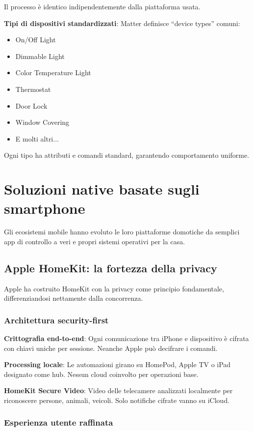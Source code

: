 Il processo è identico indipendentemente dalla piattaforma usata.

\textbf{Tipi di dispositivi standardizzati}: Matter definisce ``device types'' comuni:
\begin{itemize}
    \item On/Off Light
    \item Dimmable Light
    \item Color Temperature Light
    \item Thermostat
    \item Door Lock
    \item Window Covering
    \item E molti altri...
\end{itemize}

Ogni tipo ha attributi e comandi standard, garantendo comportamento uniforme.

\section{Soluzioni native basate sugli smartphone}

Gli ecosistemi mobile hanno evoluto le loro piattaforme domotiche da semplici app di controllo a veri e propri sistemi operativi per la casa.

\subsection{Apple HomeKit: la fortezza della privacy}

Apple ha costruito HomeKit con la privacy come principio fondamentale, differenziandosi nettamente dalla concorrenza.

\subsubsection{Architettura security-first}

\textbf{Crittografia end-to-end}: Ogni comunicazione tra iPhone e dispositivo è cifrata con chiavi uniche per sessione. Neanche Apple può decifrare i comandi.

\textbf{Processing locale}: Le automazioni girano su HomePod, Apple TV o iPad designato come hub. Nessun cloud coinvolto per operazioni base.

\textbf{HomeKit Secure Video}: Video delle telecamere analizzati localmente per riconoscere persone, animali, veicoli. Solo notifiche cifrate vanno su iCloud.

\subsubsection{Esperienza utente raffinata}

